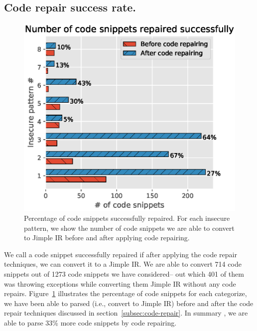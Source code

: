 \subsection{Code repair success rate.} 
\begin{figure}[ht]
  \includegraphics[width=\linewidth]{Figures/success_full_repair2.eps.eps}
  \caption{Percentage of code snippets successfully repaired. For each insecure pattern, we show the number 
  of code snippets we are able to convert to Jimple IR before and after applying code repairing.}
  \label{fig:code-repair}
\end{figure}

We call a code snippet successfully repaired if after applying the code repair techniques, we can convert it to a Jimple IR. 
We are able to convert 714 code snippets out of 1273 code snippets we have considered-- out which 401 of them was throwing exceptions
while converting them Jimple IR without any code repairs.  
Figure~\ref{fig:code-repair} 
illustrates the percentage of code snippets for each categorize, we have been able to parsed (i.e., convert to Jimple IR) before and after
the code repair techniques discussed in section~\ref{subsec:code-repair}.
In summary , we are able to parse 33\% more code snippets by code repairing.




